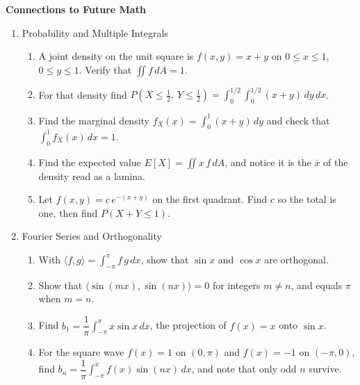 \documentclass[12pt]{article}
\newcounter{topic}
\newcommand{\examhead}[1]{\begin{center}{\large\textbf{#1}}\end{center}}
\begin{document}
\examhead{Connections to Future Math}
\begin{enumerate}\setcounter{enumi}{\value{topic}}

\item Probability and Multiple Integrals
    \begin{enumerate}
        \item A joint density on the unit square is $f(x,y)=x+y$ on $0\le x\le 1$, $0\le y\le 1$. Verify that $\iint f\,dA=1$.
        \item For that density find $P\!\left(X\le\tfrac12,\ Y\le\tfrac12\right)=\int_0^{1/2}\!\int_0^{1/2}(x+y)\,dy\,dx$.
        \item Find the marginal density $f_X(x)=\int_0^1 (x+y)\,dy$ and check that $\int_0^1 f_X(x)\,dx=1$.
        \item Find the expected value $E[X]=\iint x\,f\,dA$, and notice it is the $\bar x$ of the density read as a lamina.
        \item Let $f(x,y)=c\,e^{-(x+y)}$ on the first quadrant. Find $c$ so the total is one, then find $P(X+Y\le 1)$.
    \end{enumerate}
\bigskip

\item Fourier Series and Orthogonality
    \begin{enumerate}
        \item With $\langle f,g\rangle=\int_{-\pi}^{\pi} f\,g\,dx$, show that $\sin x$ and $\cos x$ are orthogonal.
        \item Show that $\langle \sin(mx),\sin(nx)\rangle=0$ for integers $m\ne n$, and equals $\pi$ when $m=n$.
        \item Find $b_1=\dfrac{1}{\pi}\int_{-\pi}^{\pi} x\sin x\,dx$, the projection of $f(x)=x$ onto $\sin x$.
        \item For the square wave $f(x)=1$ on $(0,\pi)$ and $f(x)=-1$ on $(-\pi,0)$, find $b_n=\dfrac{1}{\pi}\int_{-\pi}^{\pi} f(x)\sin(nx)\,dx$, and note that only odd $n$ survive.
    \end{enumerate}
\newpage


\end{enumerate}
\end{document}

